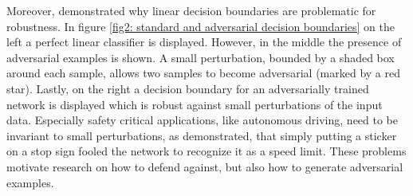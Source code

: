 \documentclass{article}
\begin{document}
Moreover, \cite{b2} demonstrated why linear decision boundaries are problematic for robustness. In figure \ref{fig2: standard and adversarial decision boundaries} on the left a perfect linear classifier is displayed. However, in the middle the presence of adversarial examples is shown. A small perturbation, bounded by a shaded box around each sample, allows two samples to become adversarial (marked by a red star). Lastly, on the right a decision boundary for an adversarially trained network is displayed which is robust against small perturbations of the input data. Especially safety critical applications, like autonomous driving, need to be invariant to small perturbations, as \cite{b6} demonstrated, that simply putting a sticker on a stop sign fooled the network to recognize it as a speed limit. These problems motivate research on how to defend against, but also how to generate adversarial examples. \\
  
\end{document}
